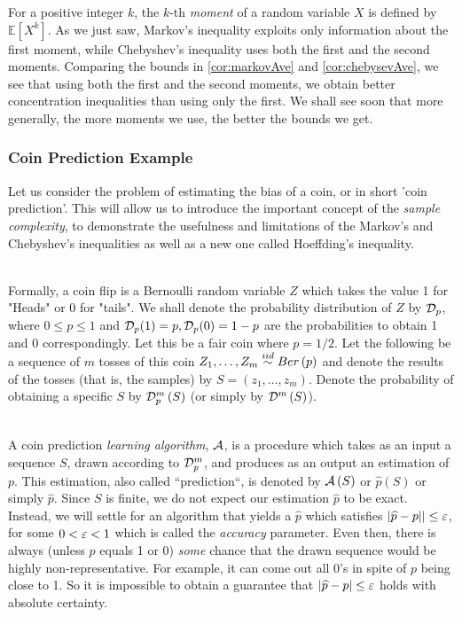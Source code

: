 For a positive integer $k$, the $k$-th \emph{moment} of a random variable $X$ is defined by $\ensuremath{\mathbb{E}}[X^k]$. As we just saw, Markov's inequality exploits only information about the first moment, while Chebyshev's inequality  uses both the first and the second moments. Comparing the bounds in \ref{cor:markovAve} and \ref{cor:chebysevAve}, we see that using both the first and the second moments, we obtain better concentration inequalities than using only the first. We shall see soon that more generally, the more moments we use, the better the bounds we get.

\subsubsection{Coin Prediction Example}  \label{sec:basicConcentration}
Let us consider the problem of estimating the bias of a coin, or in short 'coin prediction'. This will allow us to introduce the important concept of the \textit{sample complexity}, to demonstrate the usefulness and limitations of the Markov's and Chebyshev's inequalities as well as a new one called Hoeffding's inequality.

~\\Formally, a coin flip is a Bernoulli random variable $Z$ which takes the value 1 for "Heads" or 0 for "tails". We shall denote the probability distribution of $Z$ by $\mathcal{D}_p$, where $0\le p \le 1$ and $\mathcal{D}_p(1)=p, \mathcal{D}_p(0)=1-p$ are the probabilities to obtain 1 and 0 correspondingly. Let this be a fair coin where $p=1/2$. Let the following be a sequence of $m$ tosses of this coin $Z_1,\ldots,Z_m\overset{iid}{\sim} Ber\left(p\right)$ and denote the results of the tosses (that is, the samples) by $S = \left(z_1,\ldots, z_m\right)$. Denote the probability of obtaining a specific $S$ by $\mathcal{D} _p ^m\left(S\right)$ (or simply by $\mathcal{D} ^m\left(S\right)$).


~\\A coin prediction \emph{learning algorithm}, $\mathcal{A}$, is a procedure which takes as an input a sequence $S$, drawn according to $\mathcal{D}_p ^m$, and produces as an output an estimation of $p$. This estimation, also called ``prediction``, is denoted  by $\mathcal{A}\left(S\right)$ or $\widehat{p}\left(S\right)$ or simply $\widehat{p}$. Since $S$ is finite, we do not expect our estimation $\widehat{p}$ to be exact. Instead, we will settle for an algorithm that yields a $\widehat{p}$ which satisfies  $\left|\widehat{p}-p|\right|\le \varepsilon$, for some  $0< \varepsilon <1$ which is called the \emph{accuracy} parameter. Even then, there is always (unless $p$  equals 1 or 0) \textit{some} chance that the drawn sequence would be highly non-representative. For example, it can come out all 0's  in spite of $p$ being close to 1. So it is impossible to obtain a guarantee that $\left|\widehat{p}-p\right|\le\varepsilon$ holds with absolute certainty. 

